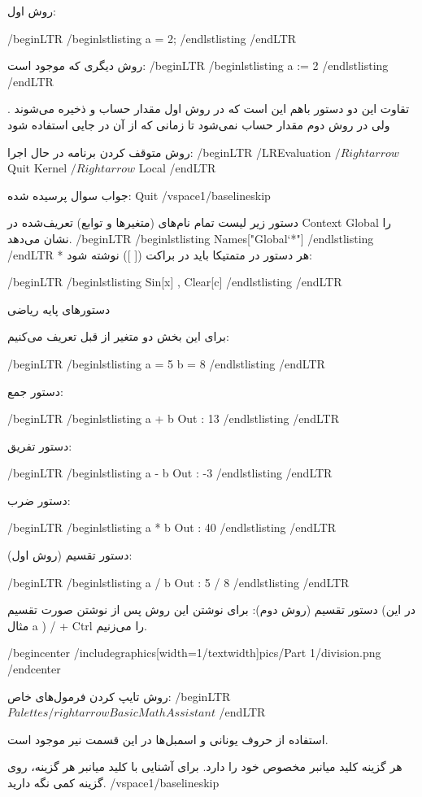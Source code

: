 روش اول:

/begin{LTR}
/begin{lstlisting}
a = 2;
/end{lstlisting}
/end{LTR}

روش دیگری که موجود است:
/begin{LTR}
/begin{lstlisting}
a := 2
/end{lstlisting}
/end{LTR}

تقاوت این دو دستور باهم این است که در روش اول مقدار حساب و ذخیره می‌شوند . ولی در روش دوم مقدار حساب نمی‌شود تا زمانی که از آن در جایی استفاده شود

روش متوقف کردن برنامه در حال اجرا:
/begin{LTR}
/LR{Evaluation $/Rightarrow$ Quit Kernel $/Rightarrow$ Local}
/end{LTR}

جواب سوال پرسیده شده: Quit
/vspace{1/baselineskip} 

دستور زیر لیست تمام نام‌های (متغیرها و توابع) تعریف‌شده در Context Global را نشان می‌دهد.
/begin{LTR}
/begin{lstlisting}
Names["Global`*"]
/end{lstlisting}
/end{LTR}
* هر دستور در متمتیکا باید در براکت ([ ]) نوشته شود:

/begin{LTR}
/begin{lstlisting}
Sin[x] , Clear[c]
/end{lstlisting}
/end{LTR}

دستورهای پایه ریاضی

برای این بخش دو متغیر از قبل تعریف می‌کنیم:

/begin{LTR}
/begin{lstlisting}
a = 5
b = 8
/end{lstlisting}
/end{LTR}

دستور جمع:

/begin{LTR}
/begin{lstlisting}
a + b        Out : 13
/end{lstlisting}
/end{LTR}

دستور تفریق:

/begin{LTR}
/begin{lstlisting}
a - b        Out : -3
/end{lstlisting}
/end{LTR}

دستور ضرب:

/begin{LTR}
/begin{lstlisting}
a * b        Out : 40
/end{lstlisting}
/end{LTR}

دستور تقسیم (روش اول):

/begin{LTR}
/begin{lstlisting}
a / b        Out : 5 / 8
/end{lstlisting}
/end{LTR}

دستور تقسیم (روش دوم): برای نوشتن این روش پس از نوشتن صورت تقسیم (در این مثال a )  / + Ctrl را می‌زنیم.

/begin{center}
/includegraphics[width=1/textwidth]{pics/Part 1/division.png}
/end{center}

روش تایپ کردن فرمول‌های خاص:
/begin{LTR}
$Palettes /rightarrow Basic Math Assistant$
/end{LTR}

استفاده از حروف یونانی و اسمبل‌ها در این قسمت نیر موجود است.

هر گزینه کلید میانبر مخصوص خود را دارد. برای آشنایی با کلید میانبر هر گزینه، روی گزینه کمی نگه دارید.
/vspace{1/baselineskip} 


